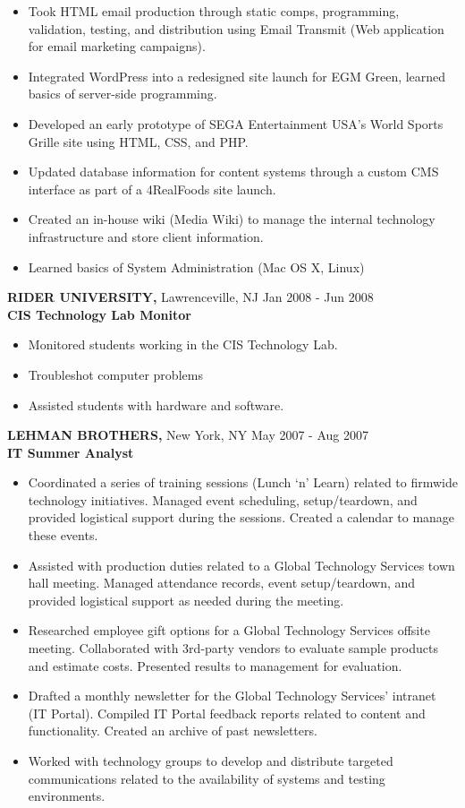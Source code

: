 \documentclass[]{article}
\providecommand{\tightlist}{%
  \setlength{\itemsep}{0pt}\setlength{\parskip}{0pt}}
\begin{document}
\begin{itemize}
\tightlist
\item
  Took HTML email production through static comps, programming,
  validation, testing, and distribution using Email Transmit (Web
  application for email marketing campaigns).
\item
  Integrated WordPress into a redesigned site launch for EGM Green,
  learned basics of server-side programming.
\item
  Developed an early prototype of SEGA Entertainment USA's World Sports
  Grille site using HTML, CSS, and PHP.
\item
  Updated database information for content systems through a custom CMS
  interface as part of a 4RealFoods site launch.
\item
  Created an in-house wiki (Media Wiki) to manage the internal
  technology infrastructure and store client information.
\item
  Learned basics of System Administration (Mac OS X, Linux)
\end{itemize}

{\textbf{RIDER UNIVERSITY,} Lawrenceville, NJ}{ Jan 2008 - Jun 2008}\\
\textbf{CIS Technology Lab Monitor}

\begin{itemize}
\tightlist
\item
  Monitored students working in the CIS Technology Lab.
\item
  Troubleshot computer problems
\item
  Assisted students with hardware and software.
\end{itemize}

{\textbf{LEHMAN BROTHERS,} New York, NY}{ May 2007 - Aug 2007}\\
\textbf{IT Summer Analyst}

\begin{itemize}
\tightlist
\item
  Coordinated a series of training sessions (Lunch `n' Learn) related to
  firmwide technology initiatives. Managed event scheduling,
  setup/teardown, and provided logistical support during the sessions.
  Created a calendar to manage these events.
\item
  Assisted with production duties related to a Global Technology
  Services town hall meeting. Managed attendance records, event
  setup/teardown, and provided logistical support as needed during the
  meeting.
\item
  Researched employee gift options for a Global Technology Services
  offsite meeting. Collaborated with 3rd-party vendors to evaluate
  sample products and estimate costs. Presented results to management
  for evaluation.
\item
  Drafted a monthly newsletter for the Global Technology Services'
  intranet (IT Portal). Compiled IT Portal feedback reports related to
  content and functionality. Created an archive of past newsletters.
\item
  Worked with technology groups to develop and distribute targeted
  communications related to the availability of systems and testing
  environments.
\end{itemize}
\end{document}
